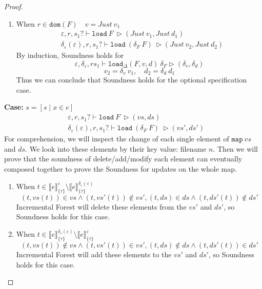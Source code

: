 \documentclass[10pt,twoside,a4paper]{article}
\theoremstyle{theorem}
\theoremstyle{lemma}
\theoremstyle{property}
\theoremstyle{definition}
\theoremstyle{assumption}
\def\newenv{\delta_\varepsilon(\varepsilon)}
\begin{document}
\begin{proof}
\begin{enumerate}
	\item
	When $r \in \mathtt{dom}(F) \quad v = Just~ v_1$
	\begin{align*}
		& \varepsilon, r, s_1? \vdash \mathtt{load}~ F~ \rhd (Just ~v_1, Just ~d_1)\\
		& \newenv, r, s_1? \vdash \mathtt{load}~ (\delta_F~F)~ \rhd (Just ~v_2, Just ~d_2)
	\end{align*}
	By induction, Soundness holds for
	\begin{displaymath}
		\varepsilon, \delta_\varepsilon, r s_1 \vdash \mathtt{load}_\Delta (F,v,d)~ \delta_F \rhd (\delta_v,\delta_d)
	\end{displaymath}
	\begin{displaymath}
		v_2 = \delta_v ~ v_1, \quad d_2 = \delta_d ~ d_1
	\end{displaymath}
	Thus we can conclude that Soundness holds for the optional specification case.
	\end{enumerate}

	\textbf{Case: } $s = [ s \mid x \in e]$\\
	\begin{align*}
		& \varepsilon, r, s_1? \vdash \mathtt{load}~ F~ \rhd (vs, ds)\\
		& \newenv, r, s_1? \vdash \mathtt{load}~ (\delta_F~F)~ \rhd (vs', ds')
	\end{align*}
	For comprehension, we will inspect the change of each single element of $\mathtt{map} ~vs$ and $ds$. We look into these elements by their key value: filename $n$. Then we will prove that the soundness of delete/add/modify each element can eventually composed together to prove the Soundness for updates on the whole map.
	\begin{enumerate}
	\item
	When $ t \in \llbracket e \rrbracket^{\varepsilon}_{\{\tau\}} \setminus \llbracket e \rrbracket^{\newenv}_{\{\tau\}}$
	\begin{displaymath}
		(t, vs(t)) \in vs \wedge (t, vs'(t)) \notin vs', (t, ds) \in ds \wedge (t, ds'(t)) \notin ds'
	\end{displaymath}
	Incremental Forest will delete these elements from the $vs'$ and $ds'$, so Soundness holds for this case.


	\item
	When $ t \in \llbracket e \rrbracket^{\newenv}_{\{\tau\}} \setminus \llbracket e \rrbracket^{\varepsilon}_{\{\tau\}}$
	\begin{displaymath}
		(t, vs(t)) \notin vs \wedge (t, vs'(t)) \in vs', (t, ds) \notin ds \wedge (t, ds'(t)) \in ds'
	\end{displaymath}
	Incremental Forest will add these elements to the $vs'$ and $ds'$, so Soundness holds for this case.



\end{enumerate}
\end{proof}
\end{document}
